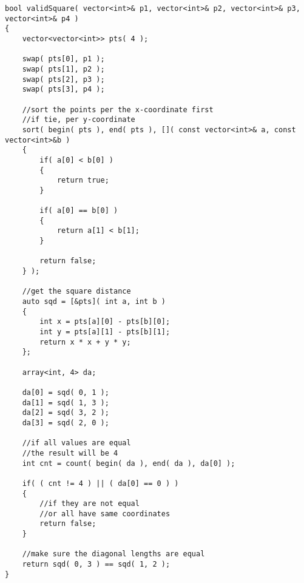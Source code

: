 \setcounter{lstlisting}{0}
\begin{lstlisting}[style=customc, caption={Sort}]
bool validSquare( vector<int>& p1, vector<int>& p2, vector<int>& p3, vector<int>& p4 )
{
    vector<vector<int>> pts( 4 );

    swap( pts[0], p1 );
    swap( pts[1], p2 );
    swap( pts[2], p3 );
    swap( pts[3], p4 );

    //sort the points per the x-coordinate first
    //if tie, per y-coordinate
    sort( begin( pts ), end( pts ), []( const vector<int>& a, const vector<int>&b )
    {
        if( a[0] < b[0] )
        {
            return true;
        }

        if( a[0] == b[0] )
        {
            return a[1] < b[1];
        }

        return false;
    } );

    //get the square distance
    auto sqd = [&pts]( int a, int b )
    {
        int x = pts[a][0] - pts[b][0];
        int y = pts[a][1] - pts[b][1];
        return x * x + y * y;
    };

    array<int, 4> da;

    da[0] = sqd( 0, 1 );
    da[1] = sqd( 1, 3 );
    da[2] = sqd( 3, 2 );
    da[3] = sqd( 2, 0 );

    //if all values are equal
    //the result will be 4
    int cnt = count( begin( da ), end( da ), da[0] );

    if( ( cnt != 4 ) || ( da[0] == 0 ) )
    {
        //if they are not equal
        //or all have same coordinates
        return false;
    }

    //make sure the diagonal lengths are equal
    return sqd( 0, 3 ) == sqd( 1, 2 );
}
\end{lstlisting}
